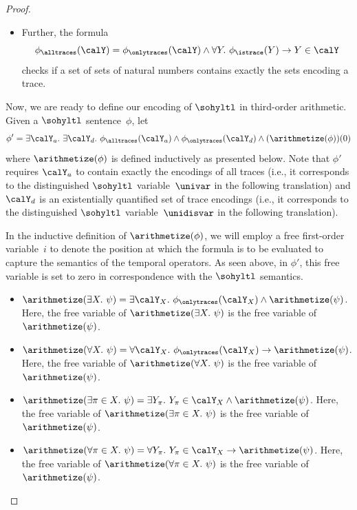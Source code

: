 \begin{proof}
\begin{itemize}
    \item Further, the formula
    \[\phi_\alltraces(\calY) = \phi_\onlytraces(\calY) \wedge \forall Y.\ \phi_\istrace(Y) \rightarrow Y \in\calY \]
    checks if a set of sets of natural numbers contains exactly the sets encoding a trace.
\end{itemize}

Now, we are ready to define our encoding of $\sohyltl$ in third-order arithmetic.
Given a $\sohyltl$ sentence~$\phi$, let 
\[\phi' = \exists \calY_a.\ \exists\calY_d.\ \phi_\alltraces(\calY_a) \wedge \phi_\onlytraces(\calY_d)\wedge (\arithmetize(\phi))(0)\]
where $\arithmetize(\phi)$ is defined inductively as presented below.
Note that $\phi'$ requires $\calY_a$ to contain exactly the encodings of all traces (i.e., it corresponds to the distinguished $\sohyltl$ variable~$\univar$ in the following translation) and $\calY_d$ is an existentially quantified set of trace encodings (i.e., it corresponds to the distinguished $\sohyltl$ variable~$\unidisvar$ in the following translation).

In the inductive definition of $\arithmetize(\phi)$, we will employ a free first-order variable~$i$ to denote the position at which the formula is to be evaluated to capture the semantics of the temporal operators.
As seen above, in $\phi'$, this free variable is set to zero in correspondence with the $\sohyltl$ semantics.
\begin{itemize}
    
    \item $\arithmetize(\exists X.\ \psi) = \exists \calY_X.\ \phi_\onlytraces(\calY_X) \wedge \arithmetize(\psi)$. Here, the free variable of $\arithmetize(\exists X.\ \psi)$ is the free variable of $\arithmetize(\psi)$. 
    
    \item $\arithmetize(\forall X.\ \psi) = \forall \calY_X.\ \phi_\onlytraces(\calY_X) \rightarrow \arithmetize(\psi)$. Here, the free variable of $\arithmetize(\forall X.\ \psi)$ is the free variable of $\arithmetize(\psi)$.
    
    \item $\arithmetize(\exists\pi\in X.\ \psi) = \exists Y_\pi.\ Y_\pi\in \calY_X \wedge \arithmetize(\psi)$. Here, the free variable of $\arithmetize(\exists \pi \in X.\ \psi)$ is the free variable of $\arithmetize(\psi)$.
    
    \item $\arithmetize(\forall\pi\in X.\ \psi) = \forall Y_\pi.\ Y_\pi\in \calY_X \rightarrow \arithmetize(\psi)$. Here, the free variable of $\arithmetize(\forall \pi \in X.\ \psi)$ is the free variable of $\arithmetize(\psi)$.
    

\end{itemize}
\end{proof}

